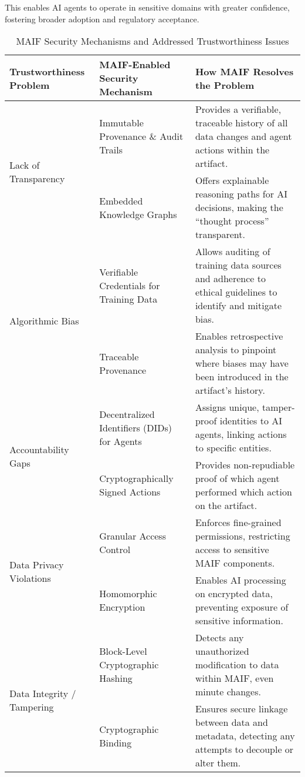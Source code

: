 \documentclass[conference]{IEEEtran}
\begin{document}
This enables AI agents to operate in sensitive domains with greater confidence, fostering broader adoption and regulatory acceptance.

\begin{table*}[!t]
\renewcommand{\arraystretch}{1.3}
\caption{MAIF Security Mechanisms and Addressed Trustworthiness Issues}
\label{tab:maif-security}
\centering
\footnotesize
\begin{tabular}{p{3cm}p{5cm}p{5.5cm}}
\toprule
\textbf{Trustworthiness Problem} & \textbf{MAIF-Enabled Security Mechanism} & \textbf{How MAIF Resolves the Problem} \\
\midrule
\multirow{2}{3cm}{Lack of Transparency} & Immutable Provenance \& Audit Trails\cite{ref9} & Provides a verifiable, traceable history of all data changes and agent actions within the artifact. \\
& Embedded Knowledge Graphs\cite{ref42} & Offers explainable reasoning paths for AI decisions, making the ``thought process'' transparent. \\
\midrule
\multirow{2}{3cm}{Algorithmic Bias} & Verifiable Credentials for Training Data\cite{ref4} & Allows auditing of training data sources and adherence to ethical guidelines to identify and mitigate bias. \\
& Traceable Provenance\cite{ref9} & Enables retrospective analysis to pinpoint where biases may have been introduced in the artifact's history. \\
\midrule
\multirow{2}{3cm}{Accountability Gaps} & Decentralized Identifiers (DIDs) for Agents\cite{ref4} & Assigns unique, tamper-proof identities to AI agents, linking actions to specific entities. \\
& Cryptographically Signed Actions\cite{ref65} & Provides non-repudiable proof of which agent performed which action on the artifact. \\
\midrule
\multirow{2}{3cm}{Data Privacy Violations} & Granular Access Control\cite{ref69} & Enforces fine-grained permissions, restricting access to sensitive MAIF components. \\
& Homomorphic Encryption\cite{ref93} & Enables AI processing on encrypted data, preventing exposure of sensitive information. \\
\midrule
\multirow{4}{3cm}{Data Integrity / Tampering} & Block-Level Cryptographic Hashing\cite{ref72} & Detects any unauthorized modification to data within MAIF, even minute changes. \\
& Cryptographic Binding\cite{ref66} & Ensures secure linkage between data and metadata, detecting any attempts to decouple or alter them. \\

\end{tabular}
\end{table*}
\end{document}
